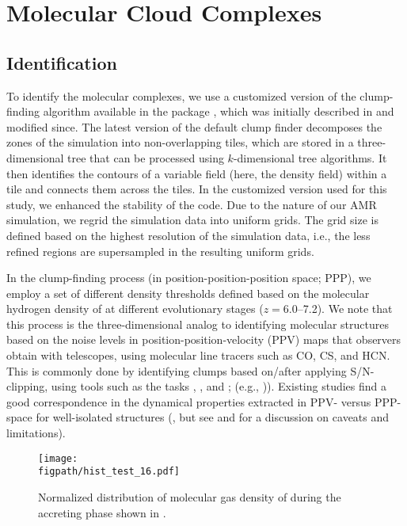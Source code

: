 \IfFileExists{emulateapjlegacy.cls}{\documentclass[iop]{emulateapjlegacy}}{\documentclass[iop]{emulateapj}}
\def\figpath{./Fig}
\begin{document}
\section{Molecular Cloud Complexes}\label{sec:eqn}

\subsection{Identification}\label{sec:method}

To identify the molecular complexes, we use a customized version of the clump-finding algorithm available in the  package  \citep{Turk11a}, which was initially described in \citet{Smith09a} and modified since.
%
The latest version of the default  clump finder decomposes the zones of the simulation into non-overlapping tiles, which are stored in a three-dimensional tree that can be processed using $k$-dimensional tree algorithms. It then identifies the contours of a variable field (here, the density field) within a tile and connects them across the tiles. In the customized version used for this study, we enhanced the stability of the code.
%
Due to the nature of our AMR simulation, we regrid the simulation data into uniform grids. The grid size is defined based on the highest resolution of the simulation data, i.e., the less refined regions are supersampled in the resulting uniform grids.

In the clump-finding process (in position-position-position space; PPP), we employ a set of different density thresholds defined based on the molecular hydrogen density of \flower at different evolutionary stages ($z=6.0$--7.2).
%
We note that this process is the three-dimensional analog to identifying molecular structures based on the noise levels in position-position-velocity (PPV) maps that observers obtain with telescopes, using molecular line tracers such as CO, CS, and HCN. This is commonly done by identifying clumps based on/after applying S/N-clipping, using tools such as the  tasks , , and ; (e.g., \citealt{Williams94a, Oka01a, Rosolowsky06a, Rosolowsky08a, DonovanMeyer13a})).
%
Existing studies find a good correspondence in the dynamical properties extracted in PPV- versus PPP-space for well-isolated structures (\citealt{Ballesteros-Paredes02a, Heitsch09a, Shetty10a, Beaumont13a, Pan15a}, but see \citealt{Ballesteros-Paredes02a} and \citealt{Shetty10a} for a discussion on caveats and limitations).

\begin{figure}[htbp]
\centering
\texttt{[image: \\figpath/hist\_test\_16.pdf]}
\caption{Normalized distribution of molecular gas density of \flower during the accreting phase shown in .
\label{fig:h2density}}
\end{figure}
\end{document}
